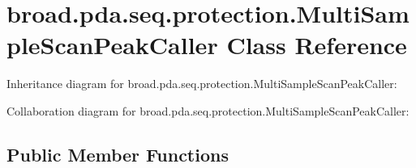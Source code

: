 \hypertarget{classbroad_1_1pda_1_1seq_1_1protection_1_1_multi_sample_scan_peak_caller}{\section{broad.\+pda.\+seq.\+protection.\+Multi\+Sample\+Scan\+Peak\+Caller Class Reference}
\label{classbroad_1_1pda_1_1seq_1_1protection_1_1_multi_sample_scan_peak_caller}
}


Inheritance diagram for broad.\+pda.\+seq.\+protection.\+Multi\+Sample\+Scan\+Peak\+Caller\+:


Collaboration diagram for broad.\+pda.\+seq.\+protection.\+Multi\+Sample\+Scan\+Peak\+Caller\+:
\subsection*{Public Member Functions}

